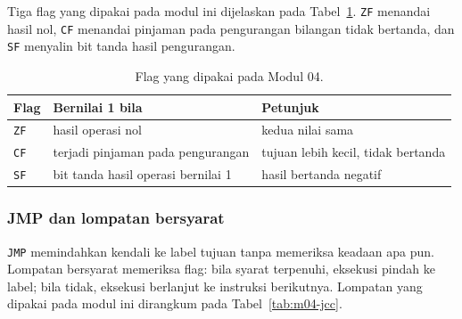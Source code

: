 Tiga flag yang dipakai pada modul ini dijelaskan pada
Tabel~\ref{tab:m04-flag}. \texttt{ZF} menandai hasil nol,
\texttt{CF} menandai pinjaman pada pengurangan bilangan tidak
bertanda, dan \texttt{SF} menyalin bit tanda hasil pengurangan.

\begin{table}[H]
    \centering
    \caption{Flag yang dipakai pada Modul 04.}
    \label{tab:m04-flag}
    \small
    \begin{tabular}{@{}lll@{}}
        \toprule
        \textbf{Flag} & \textbf{Bernilai 1 bila} & \textbf{Petunjuk} \\
        \midrule
        \texttt{ZF} & hasil operasi nol & kedua nilai sama \\
        \texttt{CF} & terjadi pinjaman pada pengurangan &
        tujuan lebih kecil, tidak bertanda \\
        \texttt{SF} & bit tanda hasil operasi bernilai 1 &
        hasil bertanda negatif \\
        \bottomrule
    \end{tabular}
\end{table}

\subsubsection*{JMP dan lompatan bersyarat}

\texttt{JMP} memindahkan kendali ke label tujuan tanpa memeriksa
keadaan apa pun. Lompatan bersyarat memeriksa flag: bila syarat
terpenuhi, eksekusi pindah ke label; bila tidak, eksekusi berlanjut
ke instruksi berikutnya. Lompatan yang dipakai pada modul ini
dirangkum pada Tabel~\ref{tab:m04-jcc}.

